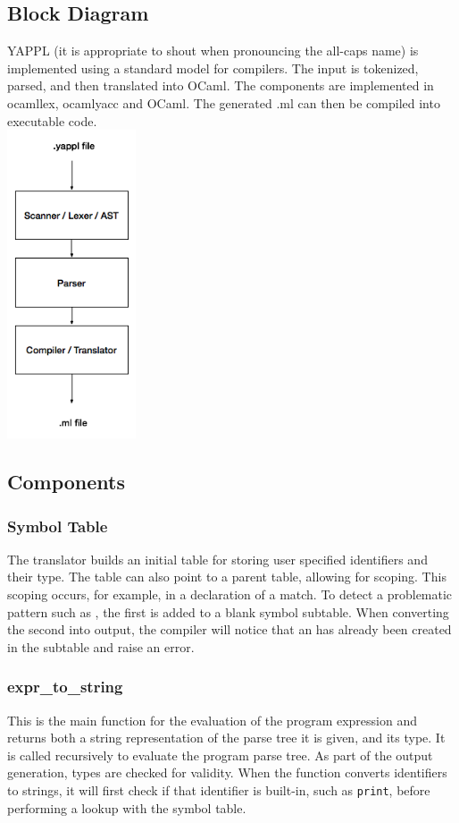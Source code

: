 \subsection{Block Diagram}

YAPPL (it is appropriate to shout when pronouncing the all-caps name) is implemented using a standard model for compilers. The input is tokenized, parsed, and then translated into OCaml. The components are implemented in ocamllex, ocamlyacc and OCaml. The generated .ml can then be compiled into executable code. \\
\includegraphics[width=1.5in]{block-diagram.png}

\subsection{Components}
\subsubsection{Symbol Table}
The translator builds an initial table for storing user specified identifiers and their type. The table can also point to a parent table, allowing for scoping. This scoping occurs, for example, in a declaration of a \term{(}  \term{::}  \term{)} match. To detect a problematic pattern such as  , the first  is added to a blank symbol subtable. When converting the second  into output, the compiler will notice that an  has already been created in the subtable and raise an error. 
\subsubsection{expr\_to\_string} 
This is the main function for the evaluation of the program expression and returns both a string representation of the parse tree it is given, and its type. It is called recursively to evaluate the program parse tree. As part of the output generation, types are checked for validity. When the function converts identifiers to strings, it will first check if that identifier is built-in, such as \texttt{print}, before performing a lookup with the symbol table.
